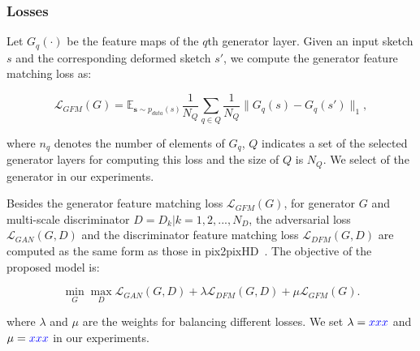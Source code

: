 
\subsubsection{Losses}



Let $G_q(·)$ be the  feature maps of the $q$th generator layer.
Given an input sketch $s$ and the corresponding deformed sketch $s'$, we compute the generator feature matching loss as:

\begin{equation}
	\label{eqn:loss_GFM}
	\mathcal{L}_{GFM}(G)=\mathbb{E}_{\mathbf{s}\sim p_{data}(s)} \frac{1}{N_Q} \sum_{q\in Q}  \frac{1}{N_Q} \|G_q(s)-G_q(s') \|_1,
\end{equation}

where $n_q$ denotes the number of elements of $G_q$, $Q$ indicates a set of the selected generator layers for computing this loss and the size of $Q$ is $N_Q$. 
We select  of the generator in our experiments.

Besides the generator feature matching loss $\mathcal{L}_{GFM}(G)$, for generator $G$ and multi-scale discriminator $D={D_k | k=1,2,...,N_D}$, the adversarial loss $\mathcal{L}_{GAN}(G, D)$ and the discriminator feature matching loss $\mathcal{L}_{DFM}(G, D)$ are computed as the same form as those in pix2pixHD~\cite{pix2pixHD}.
%
The objective of the proposed model is:

\begin{equation}
	\label{eqn:new_minmax_game}
	\min_G \max_{D} \mathcal{L}_{GAN}(G, D)+\lambda \mathcal{L}_{DFM}(G, D) +\mu \mathcal{L}_{GFM}(G).
\end{equation}

where $\lambda$ and $\mu$ are the weights for balancing different losses. We set $\lambda=\textcolor{blue}{xxx}$ and $\mu=\textcolor{blue}{xxx}$ in our experiments.